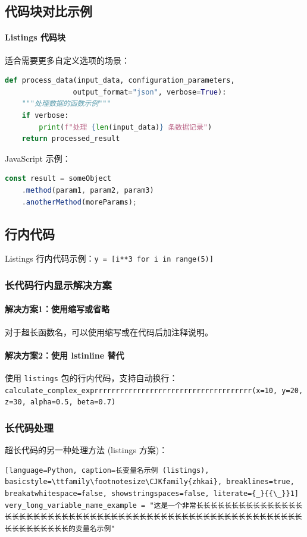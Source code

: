 \documentclass[../main]{subfiles}
\begin{document}
\subsection{代码块对比示例}

\paragraph{Listings 代码块}
适合需要更多自定义选项的场景：
\begin{lstlisting}[language=Python, caption=Python 函数示例]
def process_data(input_data, configuration_parameters,
                output_format="json", verbose=True):
    """处理数据的函数示例"""
    if verbose:
        print(f"处理 {len(input_data)} 条数据记录")
    return processed_result
\end{lstlisting}

JavaScript 示例：
\begin{lstlisting}[language=JavaScript, caption=JavaScript 链式调用示例]
const result = someObject
    .method(param1, param2, param3)
    .anotherMethod(moreParams);
\end{lstlisting}

\subsection{行内代码}

Listings 行内代码示例：\lstinline{y = [i**3 for i in range(5)]}

\subsubsection{长代码行内显示解决方案}

\paragraph{解决方案1：使用缩写或省略}
对于超长函数名，可以使用缩写或在代码后加注释说明。

\paragraph{解决方案2：使用 lstinline 替代}
使用 \texttt{listings} 包的行内代码，支持自动换行：\\
\lstinline[breaklines=true]{calculate_complex_exprrrrrrrrrrrrrrrrrrrrrrrrrrrrrrrrrrrrr(x=10, y=20, z=30, alpha=0.5, beta=0.7)}

\subsubsection{长代码处理}
超长代码的另一种处理方法 (listings 方案)：
\begin{lstlisting}[language=Python, caption=长变量名示例 (listings), basicstyle=\ttfamily\footnotesize\CJKfamily{zhkai}, breaklines=true, breakatwhitespace=false, showstringspaces=false, literate={_}{{\_}}1]
very_long_variable_name_example = "这是一个非常长长长长长长长长长长长长长长长长长长长长长长长长长长长长长长长长长长长长长长长长长长长长长长长长长长长长长长长长长长长长长长长长长长的变量名示例"
\end{lstlisting}
\end{document}
